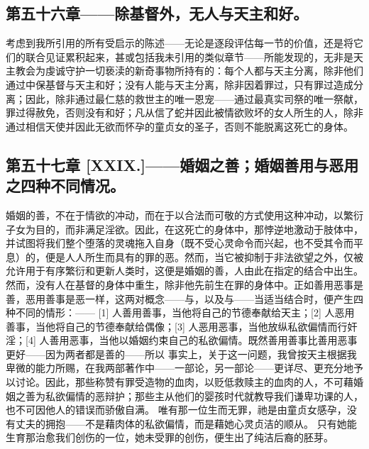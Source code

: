 
\subsection{第五十六章——除基督外，无人与天主和好。}

考虑到我所引用的所有受启示的陈述——无论是逐段评估每一节的价值，还是将它们的联合见证累积起来，甚或包括我未引用的类似章节——所能发现的，无非是天主教会为虔诚守护一切亵渎的新奇事物所持有的：每个人都与天主分离，除非他们通过中保基督与天主和好；没有人能与天主分离，除非因着罪过，只有罪过造成分离；因此，除非通过最仁慈的救世主的唯一恩宠——通过最真实司祭的唯一祭献，罪过得赦免，否则没有和好；凡从信了蛇并因此被情欲败坏的女人所生的人，除非通过相信天使并因此无欲而怀孕的童贞女的圣子，否则不能脱离这死亡的身体。\par


\subsection{第五十七章 [XXIX.]——婚姻之善；婚姻善用与恶用之四种不同情况。}

婚姻的善，不在于情欲的冲动，而在于以合法而可敬的方式使用这种冲动，以繁衍子女为目的，而非满足淫欲。因此，在这死亡的身体中，那悖逆地激动于肢体中，并试图将我们整个堕落的灵魂拖入自身（既不受心灵命令而兴起，也不受其令而平息）的，便是人人所生而具有的罪的恶。然而，当它被抑制于非法欲望之外，仅被允许用于有序繁衍和更新人类时，这便是婚姻的善，人由此在指定的结合中出生。然而，没有人在基督的身体中重生，除非他先前生在罪的身体中。正如善用恶事是善，恶用善事是恶一样，这两对概念——与，以及与——当适当结合时，便产生四种不同的情形：—— [1] 人善用善事，当他将自己的节德奉献给天主；[2] 人恶用善事，当他将自己的节德奉献给偶像；[3] 人恶用恶事，当他放纵私欲偏情而行奸淫；[4] 人善用恶事，当他以婚姻约束自己的私欲偏情。既然善用善事比善用恶事更好——因为两者都是善的——所以 事实上，关于这一问题，我曾按天主根据我卑微的能力所赐，在我两部著作中——一部论，另一部论——更详尽、更充分地予以讨论。因此，那些称赞有罪受造物的血肉，以贬低救赎主的血肉的人，不可藉婚姻之善为私欲偏情的恶辩护；那些主从他们的婴孩时代就教导我们谦卑功课的人，也不可因他人的错误而骄傲自满。 唯有那一位生而无罪，祂是由童贞女感孕，没有丈夫的拥抱——不是藉肉体的私欲偏情，而是藉她心灵贞洁的顺从。 只有她能生育那治愈我们创伤的一位，她未受罪的创伤，便生出了纯洁后裔的胚芽。\par

